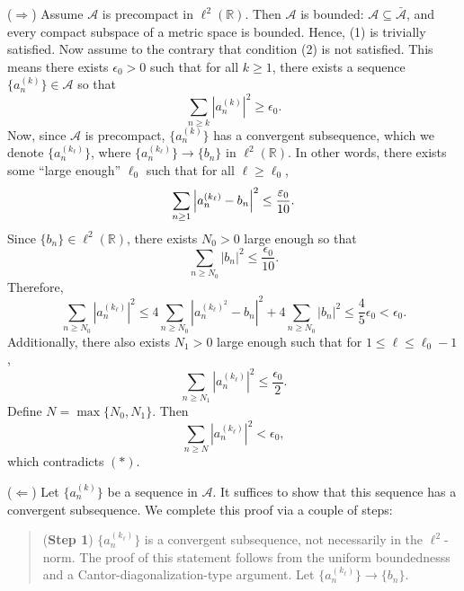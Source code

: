 \documentclass{article}
\begin{document}
\begin{itemize}
	\begin{solutions}
		($\Rightarrow$) Assume $\mathscr{A}$ is precompact in $\ell^{2}(\mathbb{R})$. Then $\mathscr{A}$ is bounded: $\mathscr{A} \subseteq \bar{\mathscr{A}}$, and every compact subspace of a metric space is bounded. Hence, (1) is trivially satisfied. Now assume to the contrary that condition (2) is not satisfied. This means there exists $\epsilon_{0} > 0$ such that for all $k\geq 1$, there exists a sequence $\{a_{n}^{(k)}\} \in \mathscr{A}$ so that 
		\begin{equation}
			\sum_{n\geq k}|a_{n}^{(k)}|^{2} \geq \epsilon_{0}. 
			\tag{\ast}
		\end{equation}
		Now, since $\mathscr{A}$ is precompact, $\{a_{n}^{(k)}\}$ has a convergent subsequence, which we denote $\{a_{n}^{(k_{\ell})}\}$, where $\{a_{n}^{(k_{\ell})}\} \to \{b_{n}\}$ in $\ell^{2}(\mathbb{R})$. In other words, there exists some ``large enough'' $\ell_{0}$ such that for all $\ell \geq \ell_{0}$, 
		\begin{equation}
			\sum_{n\geq 1}\left| a_{n}^{(k_{\ell})} - b_{n} \right|^{2} \leq \frac{\varepsilon_{0}}{10}. 
		\end{equation}
		Since $\{b_{n}\} \in \ell^{2}(\mathbb{R})$, there exists $N_{0} > 0$ large enough so that 
		\begin{equation}
			\sum_{n\geq N_{0}}|b_{n}|^{2} \leq \frac{\epsilon_{0}}{10}. 
		\end{equation}
		Therefore, 
		\begin{equation}
			\sum_{n\geq N_{0}}|a_{n}^{(k_{\ell})}|^{2} \leq 4\sum_{n \geq N_{0}}|a_{n}^{(k_{\ell})^{2}} - b_{n}|^{2} + 4\sum_{n\geq N_{0}}|b_{n}|^{2} \leq \frac{4}{5}\epsilon_{0} < \epsilon_{0}. 
		\end{equation}
		Additionally, there also exists $N_{1} > 0$ large enough such that for $1 \leq \ell \leq \ell_{0} - 1$, 
		\begin{equation}
			\sum_{n\geq N_{1}}|a_{n}^{(k_{\ell})}|^{2} \leq \frac{\epsilon_{0}}{2}. 
		\end{equation}
		Define $N = \max\{N_{0}, N_{1}\}$. Then 
		\begin{equation}
			\sum_{n\geq N}|a_{n}^{(k_{\ell})}|^{2} < \epsilon_{0}, 
		\end{equation}
		which contradicts $(\ast)$. 
		
		($\Leftarrow$) Let $\{a_{n}^{(k)}\}$ be a sequence in $\mathscr{A}$. It suffices to show that this sequence has a convergent subsequence. We complete this proof via a couple of steps: 
		\begin{quote}
			(\textbf{Step 1}) $\{a_{n}^{(k_{\ell})}\}$ is a convergent subsequence, not necessarily in the $\ell^{2}$-norm. The proof of this statement follows from the uniform boundednesss and a Cantor-diagonalization-type argument. Let $\{a_{n}^{(k_{\ell})}\} \to \{b_{n}\}$. 
			

\end{quote}
\end{solutions}
\end{itemize}
\end{document}
